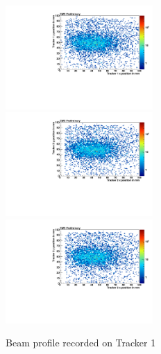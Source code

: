\begin{figure}[!htbp]
\centering
\includegraphics[width=0.5\textwidth]{figures/GEM/profile_plots_for_Tracker1_Run1897.pdf}%
\includegraphics[width=0.5\textwidth]{figures/GEM/profile_plots_for_Tracker2_Run1897.pdf}\\
\includegraphics[width=0.5\textwidth]{figures/GEM/profile_plots_for_Tracker3_Run1897.pdf}
\caption{Beam profile recorded on Tracker 1}\label{fig:t1bp}
\end{figure}





